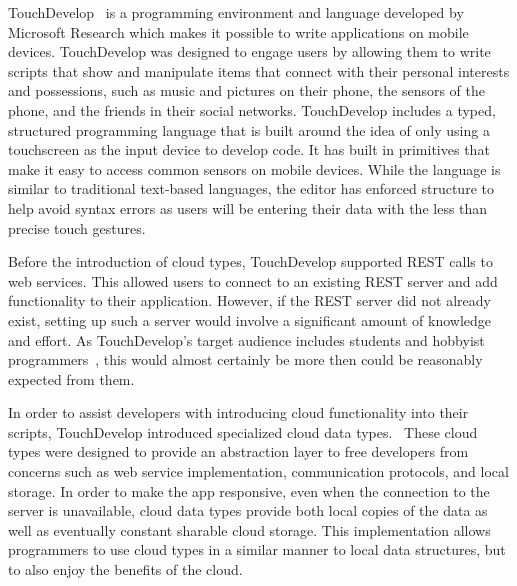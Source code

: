 \documentclass{sigplanconf}
\begin{document}
TouchDevelop~\cite{Tillmann2011TPC20482372048245} is a programming environment and language developed by Microsoft Research which makes it possible to write applications on mobile devices.  TouchDevelop was designed to engage users by allowing them to write scripts that show and manipulate items that connect with their personal interests and possessions, such as music and pictures on their phone, the sensors of the phone, and the friends in their social networks.  TouchDevelop includes a typed, structured programming language that is built around the idea of only using a touchscreen as the input device to develop code.  It has built in primitives that make it easy to access common sensors on mobile devices.  While the language is similar to traditional text-based languages, the editor has enforced structure to help avoid syntax errors as users will be entering their data with the less than precise touch gestures.
  
Before the introduction of cloud types, TouchDevelop supported REST calls to web services.  This allowed users to connect to an existing REST server and add functionality to their application.  However, if the REST server did not already exist, setting up such a server would involve a significant amount of knowledge and effort.  As TouchDevelop's target audience includes students and hobbyist programmers~\cite{Tillmann2011TPC20482372048245}, this would almost certainly be more then could be reasonably expected from them.  

In order to assist developers with introducing cloud functionality into their scripts, TouchDevelop introduced specialized cloud data types.~\cite{burckhardt2012cloud}  These cloud types were designed to provide an abstraction layer to free developers from concerns such as web service implementation, communication protocols, and local storage.  In order to make the app responsive, even when the connection to the server is unavailable, cloud data types provide both local copies of the data as well as eventually constant sharable cloud storage.   This implementation allows programmers to use cloud types in a similar manner to local data structures, but to also enjoy the benefits of the cloud.
\end{document}
